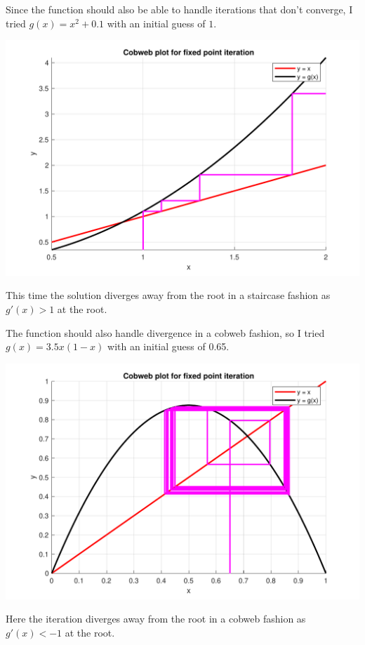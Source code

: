 \documentclass[a4paper,11pt]{article}
\begin{document}
\begin{enumerate}
	Since the function should also be able to handle iterations that don't 
	converge, I tried $g(x)=x^{2} + 0.1$ with an initial guess of 
	$1$.
	
	\begin{center}
		\includegraphics[scale=0.6]{images/Q1d_divergance.pdf}
	\end{center}
	This time the solution diverges away from the root in a staircase fashion 
	as $g'(x)>1$ at the root.
	
	The function should also handle divergence in a cobweb fashion, so I 
	tried $g(x) = 3.5x(1-x)$ with an initial guess of 0.65.
	
	\begin{center}
		\includegraphics[scale=0.6]{images/Q1d_divcob.pdf}
	\end{center}
	Here the iteration diverges away from the root in a cobweb fashion as 
	$g'(x)<-1$ at the root.
	

\end{enumerate}
\end{document}
